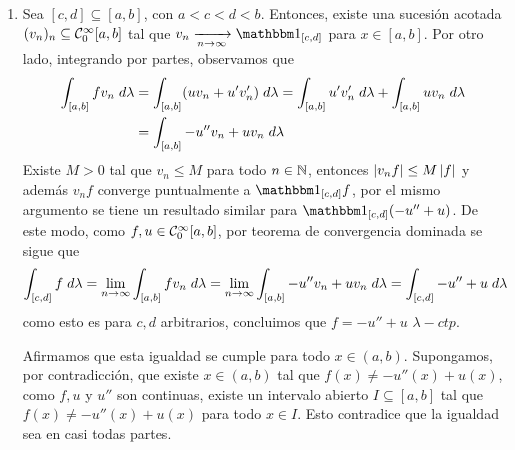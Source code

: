 \documentclass{article}
\begin{document}
\begin{enumerate}
    \item Sea $[c,d]\subseteq[a,b]$, con $a<c<d<b$. Entonces, existe una sucesión acotada 
    $(v_{n})_{n}\subseteq\mathcal{C}_{0}^{\infty}[a,b]$ tal que $v_{n}\xrightarrow[n\to\infty]{}
    \I_{[c,d]}$ para $x\in[a,b]$. Por otro lado, integrando por partes, observamos que
    \begin{align*}
        \int_{[a,b]}fv_{n}\hspace{1mm}d\lambda &= \int_{[a,b]}(uv_{n}+u'v_{n}')\hspace{1mm}d\lambda
        =\int_{[a,b]}u'v_{n}'\hspace{1mm}d\lambda+\int_{[a,b]}uv_{n}\hspace{1mm}d\lambda \\
        &= \int_{[a,b]}-u''v_{n}+uv_{n}\hspace{1mm}d\lambda
    \end{align*}
    Existe $M>0$ tal que $v_{n}\leq M$ para todo $n\in\mathbb{N}$, entonces $\left|v_{n}f \right|\leq M\left|f \right|$ y 
    además $v_{n}f$ converge puntualmente a $\I_{[c,d]}f$, por el mismo argumento se tiene un 
    resultado similar para $\I_{[c,d]}(-u''+u)$. De este modo, como $f,u\in\mathcal{C}_{0}^{\infty}[a,b]$, 
    por teorema de convergencia dominada se sigue que
    \begin{equation*}
        \int_{[c,d]}f\hspace{1mm}d\lambda=\lim\limits_{n\to\infty}
        \int_{[a,b]}fv_{n}\hspace{1mm}d\lambda=\lim\limits_{n\to\infty}
        \int_{[a,b]}-u''v_{n}+uv_{n}\hspace{1mm}d\lambda=\int_{[c,d]}-u''+u\hspace{1mm}d\lambda
    \end{equation*}
    como esto es para $c,d$ arbitrarios, concluimos que $f=-u''+u$ $\lambda-ctp$. 
    
    Afirmamos que esta igualdad se cumple para todo $x\in(a,b)$. Supongamos, por contradicción, 
    que existe $x\in(a,b)$ tal que $f(x)\neq-u''(x)+u(x)$, como $f,u$ y $u''$ son continuas, 
    existe un intervalo abierto $I\subseteq[a,b]$ tal que $f(x)\neq-u''(x)+u(x)$ para todo 
    $x\in I$. Esto contradice que la igualdad sea en casi todas partes.


\end{enumerate}
\end{document}
